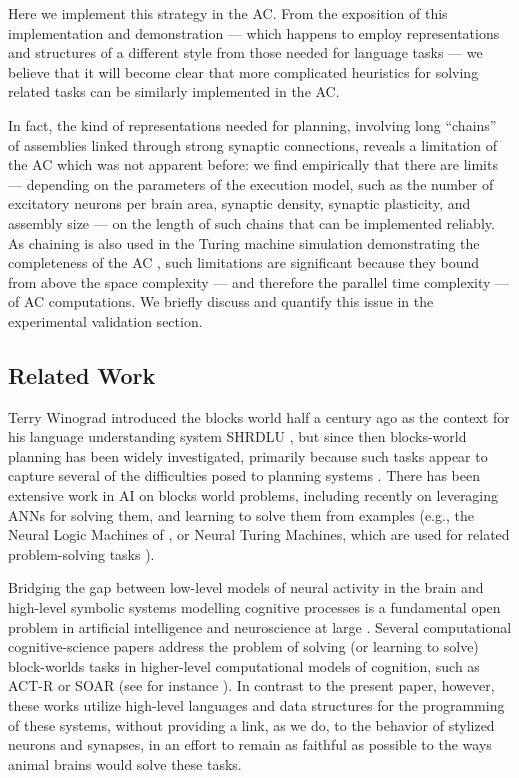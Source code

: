 \documentclass[letterpaper]{article}
\begin{document}
Here we implement this strategy in the AC.  From the exposition of this implementation and demonstration --- which happens to employ representations and structures of a different style from those needed for language tasks \cite{papadimitriou2020,mitropolsky_biologically_2021} --- we believe that it will become clear that more complicated heuristics for solving related tasks can be similarly implemented in the AC. 

In fact, the kind of representations needed for planning, involving long ``chains'' of assemblies linked through strong synaptic connections, reveals a limitation of the AC which was not apparent before: we find empirically that there are limits --- depending on the parameters of the execution model, such as the number of excitatory neurons per brain area, synaptic density, synaptic plasticity, and assembly size --- on the length of such chains that can be implemented reliably.  As chaining is also used in the Turing machine simulation demonstrating the completeness of the AC \cite{papadimitriou2020}, such limitations are significant because they bound from above the space complexity --- and therefore the parallel time complexity --- of AC computations.  We briefly discuss and quantify this issue in the experimental validation section. 


\subsection{Related Work}\label{sec:related}

Terry Winograd introduced the blocks world half a century ago as the context for his language understanding system SHRDLU \cite{winograd1971}, but since then {blocks-world planning}  has been widely investigated, primarily because such tasks appear to
capture several of the difficulties posed to planning systems \cite{gupta1991,gupta1992}.  There has been extensive work in AI on blocks world problems, including recently on leveraging ANNs for solving them, and learning to solve them from examples (e.g., the Neural Logic Machines of \cite{dong2018neural}, or Neural Turing Machines, which are used for related problem-solving tasks \cite{graves2014neural}).  

Bridging the gap between low-level models of neural activity in the brain and high-level symbolic systems modelling cognitive processes is a fundamental open problem in artificial intelligence and neuroscience at large \cite{doursat_bridging_2013,aaaiChady99}. 
Several computational cognitive-science papers address the problem of solving (or learning to solve) block-worlds tasks in higher-level computational models of cognition, such as ACT-R or SOAR (see for instance \cite{actr-soar-kennedy, kurup-thesis,Panov2017}).  In contrast to the present paper, however, these works utilize high-level languages and  data structures for the programming of these systems, without providing a link, as we do, to the behavior of stylized neurons and synapses, in an effort to remain as faithful as possible to the ways animal brains would solve these tasks. 
\end{document}
